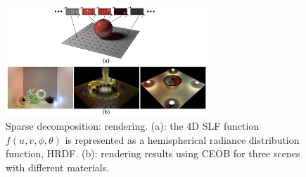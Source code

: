 \begin{figure}[ht]
  \centering
  \includegraphics[width=3in]{images/rendering_learning}
  \caption{Sparse decomposition: rendering\cite{miandji2013learning}. (a): the 4D SLF function $f(u,v,\phi,\theta)$ is represented as a hemispherical radiance distribution function, HRDF. (b): rendering results using CEOB for three scenes with different materials.}
  \label{fig:renderinglearning}
\end{figure} 